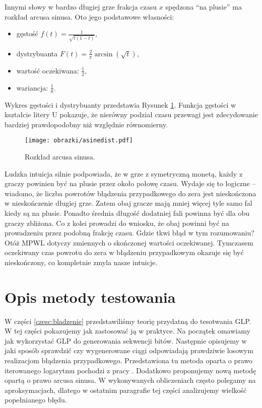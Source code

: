 \documentclass[a4paper,11pt,oneside]{book}
\theoremstyle{definition}
\begin{document}
Innymi słowy w bardzo długiej grze frakcja czasu $x$ spędzona ``na plusie'' ma rozkład arcusa sinusa. Oto jego podstawowe własności:
\begin{itemize}
 \item gęstość $f(t) =  \frac{1}{\sqrt{t(1-t)}}$,
 \item dystrybuanta $F(t) =  \frac{2}{\pi}\arcsin(\sqrt{t})$,
 \item wartość oczekiwana: $\frac{1}{2}$,
 \item wariancja: $\frac{1}{8}$.
\end{itemize}
Wykres gęstości i dystrybuanty przedstawia Rysunek \ref{fig:asine_dist}. Funkcja gęstości w kształcie litery U pokazuje, że nierówny podział czasu przewagi jest zdecydowanie bardziej prawdopodobny niż względnie równomierny.
\begin{figure}[ht]
 \centering
 \texttt{[image: obrazki/asinedist.pdf]}
 \caption{Rozkład arcusa sinusa.}
 \label{fig:asine_dist}
\end{figure}

Ludzka intuicja silnie podpowiada, że w grze z symetryczną monetą, każdy z graczy powinien być na plusie przez około połowę czasu. Wydaje się to logiczne -- wiadomo, że liczba powrotów błądzenia przypadkowego do zera jest nieskończona w nieskończenie długiej grze. Zatem obaj gracze mają mniej więcej tyle samo fal kiedy są na plusie. Ponadto średnia długość dodatniej fali powinna być dla obu graczy zbliżona. Co z kolei prowadzi do wniosku, że obaj powinni być na prowadzeniu przez podobną frakcję czasu. Gdzie tkwi błąd w tym rozumowaniu? Otóż MPWL dotyczy zmiennych o skończonej wartości oczekiwanej. Tymczasem oczekiwany czas powrotu do zera w błądzeniu przypadkowym okazuje się być nieskończony, co kompletnie zmyla nasze intuicje.

\chapter{Opis metody testowania}
\label{czesc:metoda}
W części \ref{czesc:bladzenie} przedstawiliśmy teorię przydatną do tesotwania GLP. W tej części pokazujemy jak zastosować ją w praktyce.
Na początek omawiamy jak wykorzystać GLP do generowania sekwencji bitów. Następnie opisujemy w jaki sposób sprawdzić czy wygenerowane ciągi odpowiadają prawdziwie losowym realizacjom błądzenia przypadkowego. Przedstawiona tu metoda oparta o prawo iterowanego logarytmu pochodzi z pracy \cite{wang-nic}. Dodatkowo proponujemy nową metodę opartą o prawo arcusa sinusa. W wykonywanych obliczeniach często polegamy na aproksymacjach, dlatego w ostatnim paragrafie tej części analizujemy wielkość popełnianego błędu.
\end{document}
